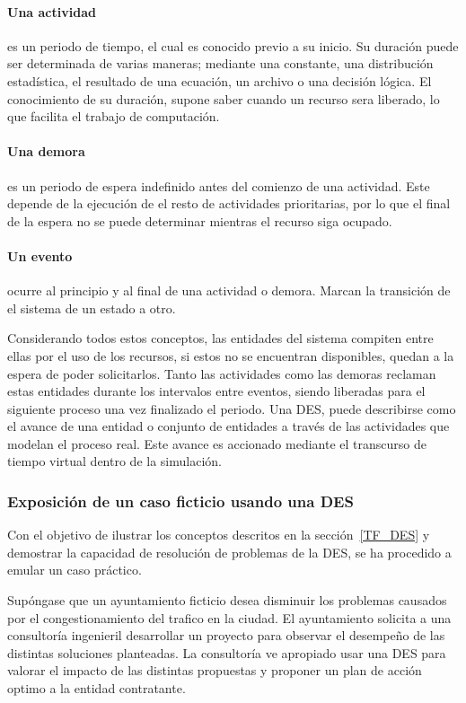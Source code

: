 \paragraph{Una actividad}
es un periodo de tiempo,
el cual es conocido previo a su inicio.
Su duración puede ser determinada de varias maneras;
mediante una constante, una distribución estadística,
el resultado de una ecuación, un archivo o una decisión lógica.
El conocimiento de su duración,
supone saber cuando un recurso sera liberado,
lo que facilita el trabajo de computación.

\paragraph{Una demora}
es un periodo de espera indefinido
antes del comienzo de una actividad.
Este depende de la ejecución
de el resto de actividades prioritarias,
por lo que el final de la espera no se puede determinar
mientras el recurso siga ocupado.

\paragraph{Un evento}
ocurre al principio y al final de una actividad o demora.
Marcan la transición de el sistema de un estado a otro.

Considerando todos estos conceptos,
las entidades del sistema compiten entre ellas por el uso de los recursos,
si estos no se encuentran disponibles, quedan a la espera de poder solicitarlos.
Tanto las actividades como las demoras reclaman estas entidades
durante los intervalos entre eventos,
siendo liberadas para el siguiente proceso una vez finalizado el periodo.
Una DES, puede describirse como el avance de una entidad o conjunto de entidades
a través  de las actividades que modelan el proceso real.
Este avance es accionado
mediante el transcurso de tiempo virtual dentro de la simulación.

\subsubsection{Exposición de un caso ficticio usando una DES}\label{example_descrp}

Con el objetivo de ilustrar los conceptos descritos en la sección~\ref{TF_DES}
y demostrar la capacidad de resolución de problemas de la DES,
se ha procedido a emular un caso práctico.

Supóngase que un ayuntamiento ficticio desea disminuir
los problemas causados por el congestionamiento del trafico en la ciudad.
El ayuntamiento solicita a una consultoría ingenieril
desarrollar un proyecto para observar el
desempeño de las distintas soluciones planteadas.
La consultoría ve apropiado usar una DES para valorar
el impacto de las distintas propuestas
y proponer un plan de acción optimo a la entidad contratante.

